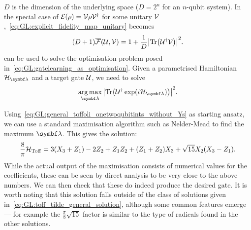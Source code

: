 $D$ is the dimension of the underlying space ($D=2^n$ for an $n$-qubit system).
In the special case of ${\mathcal{E}}(\rho)={\mathcal{V}}\rho {\mathcal{V}}^\dagger$ for some unitary ${\mathcal{V}}$,~\cref{eq:GL:explicit_fidelity_map_unitary} becomes
\begin{equation}
    (D+1) \overline{{\mathcal{F}}}({\mathcal{U}}, {\mathcal{V}}) =
    1 + \frac{1}{D} \abs{\Tr({\mathcal{U}}^\dagger {\mathcal{V}})}^2.
    \label{eq:GL:explicit_fidelity_unitary_unitary}
\end{equation}
 can be used to solve the optimisation problem posed in~\cref{eq:GL:gatelearning_as_optimisation}.
Given a parametrised Hamiltonian $\calH_{\bslambda}$ and a target gate ${\mathcal{U}}$, we need to solve
\begin{equation}
    \argmax_{\bslambda} \abs{\Tr(\calU^\dagger \exponential(i\calH_\bslambda))}^2.
\end{equation}

Using~\cref{eq:GL:general_toffoli_onetwoqubitints_without_Ys} as starting ansatz, we can use a standard maximisation algorithm such as Nelder-Mead to find the maximum $\bslambda$. This gives the solution:
\begin{equation}
    \frac{8}{\pi}{\mathcal{H}}_{\operatorname{Toff}} = 3 (X_3 + Z_1) - 2 Z_2 + Z_1 Z_2 + (Z_1 + Z_2)X_3
    +\sqrt{15} X_2 (X_3 - Z_1).
    \label{eq:GL:naiveOptim_working_example}
\end{equation}
While the actual output of the maximisation consists of numerical values for the coefficients, these can be seen by direct analysis to be very close to the above numbers. We can then check that these do indeed produce the desired gate.
It is worth noting that this solution falls outside of the class of solutions given in~\cref{eq:GL:toff_tilde_general_solution}, although some common features emerge --- for example the $\frac{\pi}{8}\sqrt{15}$ factor is similar to the type of radicals found in the other solutions.

